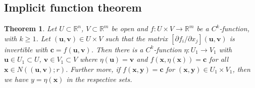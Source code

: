 \documentclass[letter-paper]{tufte-book}
\newtheorem{theorem}{\color{pastel-blue}Theorem}[section]
\begin{document}

\subsection{Implicit function theorem}

\begin{theorem}
  Let $U\subset \mathbb{R}^n$, $V \subset \mathbb{R}^m$ be open and $f : U
  \times V \to \mathbb{R}^m$ be a $C^k$-function, with $k \geq 1$. Let
  $(\boldsymbol{u}, \boldsymbol{v}) \in U \times V$ such that the matrix
  $[\partial f_i / \partial x_j](\boldsymbol{u}, \boldsymbol{v})$ is invertible
  with $\boldsymbol{c} = f(\boldsymbol{u}, \boldsymbol{v})$. Then there is a
  $C^k$-function $\eta : U_1 \to V_1$ with $\boldsymbol{u} \in U_1 \subset U$,
  $\boldsymbol{v} \in V_1 \subset V$ where $\eta(\boldsymbol{u}) =
  \boldsymbol{v}$ and $f(\boldsymbol{x}, \eta(\boldsymbol{x})) = \boldsymbol{c}$
  for all $\boldsymbol{x} \in N( (\boldsymbol{u}, \boldsymbol{v}); r)$. Further
  more, if $f(\boldsymbol{x}, \boldsymbol{y}) = \boldsymbol{c}$ for
  $(\boldsymbol{x}, \boldsymbol{y}) \in U_1 \times V_1$, then we have $y =
  \eta(\boldsymbol{x})$ in the respective sets.
\end{theorem}
\end{document}
